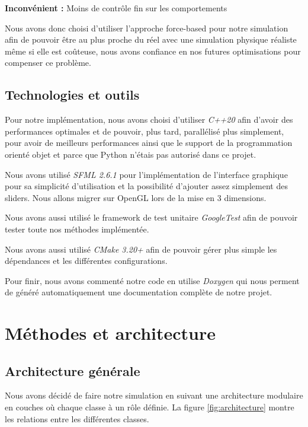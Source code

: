 \documentclass[11pt,a4paper]{article}
\begin{document}
\textbf{Inconvénient :} Moins de contrôle fin sur les comportements

Nous avons donc choisi d'utiliser l'approche force-based pour notre simulation afin de pouvoir être au plus proche du réel avec une simulation physique réaliste même si elle est coûteuse, nous avons confiance en nos futures optimisations pour compenser ce problème.

\subsection{Technologies et outils}
Pour notre implémentation, nous avons choisi d'utiliser \textit{C++20} afin d'avoir des performances optimales et de pouvoir, plus tard, parallélisé plus simplement, pour avoir de meilleurs performances ainsi que le support de la programmation orienté objet et parce que Python n'étais pas autorisé dans ce projet.

Nous avons utilisé \textit{SFML 2.6.1} pour l'implémentation de l'interface graphique pour sa simplicité d'utilisation et la possibilité d'ajouter assez simplement des sliders.
Nous allons migrer sur OpenGL lors de la mise en 3 dimensions.

Nous avons aussi utilisé le framework de test unitaire \textit{GoogleTest} afin de pouvoir tester toute nos méthodes implémentée.

Nous avons aussi utilisé \textit{CMake 3.20+} afin de pouvoir gérer plus simple les dépendances et les différentes configurations.

Pour finir, nous avons commenté notre code en utilise \textit{Doxygen} qui nous perment de généré automatiquement une documentation complète de notre projet.



\section{Méthodes et architecture}
\subsection{Architecture générale}
Nous avons décidé de faire notre simulation en suivant une architecture modulaire en couches où chaque classe à un rôle définie. La figure \ref{fig:architecture} montre les relations entre les différentes classes.
\end{document}
